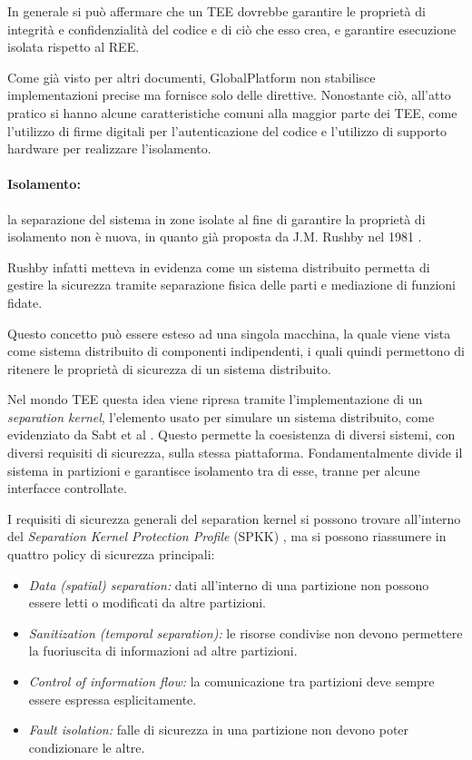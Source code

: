 \documentclass[12pt,italian]{report}
\begin{document}
	\bigbreak
	
	In generale si può affermare che un TEE dovrebbe garantire le proprietà di integrità e confidenzialità del codice e di ciò che esso crea, e garantire esecuzione isolata rispetto al REE.
	
	Come già visto per altri documenti, GlobalPlatform non stabilisce implementazioni precise ma fornisce solo delle direttive. Nonostante ciò, all'atto pratico si hanno alcune caratteristiche comuni alla maggior parte dei TEE, come l'utilizzo di firme digitali per l'autenticazione del codice e l'utilizzo di supporto hardware per realizzare l'isolamento.
	
	\bigbreak
	
	\paragraph{Isolamento:} la separazione del sistema in zone isolate al fine di garantire la proprietà di isolamento non è nuova, in quanto già proposta da J.M. Rushby nel 1981 \cite{rushby1981separationkernel}. 
	
	Rushby infatti metteva in evidenza come un sistema distribuito permetta di gestire la sicurezza tramite separazione fisica delle parti e mediazione di funzioni fidate.
	
	Questo concetto può essere esteso ad una singola macchina, la quale viene vista come sistema distribuito di componenti indipendenti, i quali quindi permettono di ritenere le proprietà di sicurezza di un sistema distribuito.
	
	Nel mondo TEE questa idea viene ripresa tramite l'implementazione di un \textit{separation kernel}, l'elemento usato per simulare un sistema distribuito, come evidenziato da Sabt et al \cite{sabt2015tee}. Questo permette la coesistenza di diversi sistemi, con diversi requisiti di sicurezza, sulla stessa piattaforma. Fondamentalmente divide il sistema in partizioni e garantisce isolamento tra di esse, tranne per alcune interfacce controllate.
	
	I requisiti di sicurezza generali del separation kernel si possono trovare all'interno del \textit{Separation Kernel Protection Profile} (SPKK) \cite{spkk2007}, ma si possono riassumere in quattro policy di sicurezza principali: 
	\begin{itemize}
		\item \textit{Data (spatial) separation:} dati all'interno di una partizione non possono essere letti o modificati da altre partizioni.
		\item \textit{Sanitization (temporal separation):} le risorse condivise non devono permettere la fuoriuscita di informazioni ad altre partizioni.
		\item \textit{Control of information flow:} la comunicazione tra partizioni deve sempre essere espressa esplicitamente.
		\item \textit{Fault isolation:} falle di sicurezza in una partizione non devono poter condizionare le altre.
	\end{itemize}
	
\end{document}
